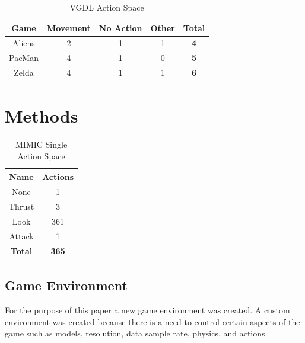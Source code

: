 \documentclass[12pt]{thesis}
\begin{document}
\begin{table}
  \caption{VGDL Action Space}
  \begin{center}
    \begin{tabular}{ | c | c | c | c | c | }
      \hline
      \bf Game & \bf Movement & \bf No Action & \bf Other & \bf Total \\ \hline
      Aliens & 2 & 1 & 1 & \bf 4 \\ \hline
      PacMan & 4 & 1 & 0 & \bf 5 \\ \hline
      Zelda & 4 & 1 & 1 & \bf 6 \\
      \hline
    \end{tabular}
  \end{center}
  \label{tab:vgdl_as}
\end{table}




\chapter{Methods}
\begin{table}
  \caption{MIMIC Single Action Space}
  \begin{center}
    \begin{tabular}{ | c | c | }
      \hline
      \bf Name & \bf Actions \\ \hline
      \hline
      None & 1 \\ \hline
      Thrust & 3 \\ \hline
      Look & 361 \\ \hline
      Attack & 1 \\ \hline
      \bf Total & \bf 365 \\
      \hline
    \end{tabular}
  \end{center}
  \label{tab:mimic_as}
\end{table}


\section{Game Environment}
For the purpose of this paper a new game environment was created. A custom 
environment was created because there is a need to control certain aspects of 
the game such as models, resolution, data sample rate, physics, and actions. 
\end{document}
